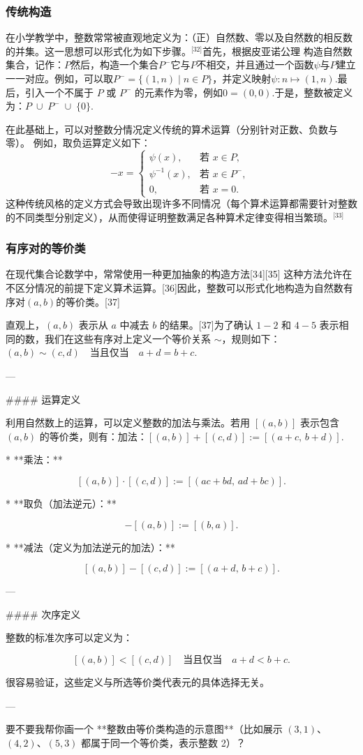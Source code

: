 \subsubsection{传统构造}
在小学教学中，整数常常被直观地定义为：（正）自然数、零以及自然数的相反数的并集。这一思想可以形式化为如下步骤。\(^\text{[32]}\)首先，根据皮亚诺公理 构造自然数集合，记作：$P$然后，构造一个集合$P^{-}$它与$P$不相交，并且通过一个函数$\psi$与$P$建立一一对应。例如，可以取$P^{-} = \{(1,n) \mid n \in P\}$，并定义映射$\psi : n \mapsto (1,n)$.最后，引入一个不属于 $P$ 或 $P^{-}$ 的元素作为零，例如$0 = (0,0)$.于是，整数被定义为：$P \;\cup\; P^{-} \;\cup\; \{0\}$.

在此基础上，可以对整数分情况定义传统的算术运算（分别针对正数、负数与零）。
例如，取负运算定义如下：
$$
-x =
\begin{cases}
\psi(x), & \text{若 } x \in P, \\[6pt]
\psi^{-1}(x), & \text{若 } x \in P^{-}, \\[6pt]
0, & \text{若 } x = 0.
\end{cases}~
$$
这种传统风格的定义方式会导致出现许多不同情况（每个算术运算都需要针对整数的不同类型分别定义），从而使得证明整数满足各种算术定律变得相当繁琐。\(^\text{[33]}\)
\subsubsection{有序对的等价类}
在现代集合论数学中，常常使用一种更加抽象的构造方法[34][35] 这种方法允许在不区分情况的前提下定义算术运算。[36]因此，整数可以形式化地构造为自然数有序对$(a,b)$的等价类。[37]

直观上，$(a,b)$ 表示从 $a$ 中减去 $b$ 的结果。[37]为了确认 $1-2$ 和 $4-5$ 表示相同的数，我们在这些有序对上定义一个等价关系 $\sim$，规则如下：$(a,b) \sim (c,d) \quad \text{当且仅当} \quad a+d = b+c$.

---

#### 运算定义

利用自然数上的运算，可以定义整数的加法与乘法。若用 $[(a,b)]$ 表示包含 $(a,b)$ 的等价类，则有：加法：$[(a,b)] + [(c,d)] := [(a+c,\, b+d)]$.

* **乘法：**

$$
[(a,b)] \cdot [(c,d)] := [(ac+bd,\, ad+bc)].
$$

* **取负（加法逆元）：**

$$
-[(a,b)] := [(b,a)].
$$

* **减法（定义为加法逆元的加法）：**

$$
[(a,b)] - [(c,d)] := [(a+d,\, b+c)].
$$

---

#### 次序定义

整数的标准次序可以定义为：

$$
[(a,b)] < [(c,d)] \quad \text{当且仅当} \quad a+d < b+c.
$$

很容易验证，这些定义与所选等价类代表元的具体选择无关。

---

要不要我帮你画一个 **整数由等价类构造的示意图**（比如展示 $(3,1)$、$(4,2)$、$(5,3)$ 都属于同一个等价类，表示整数 2）？
